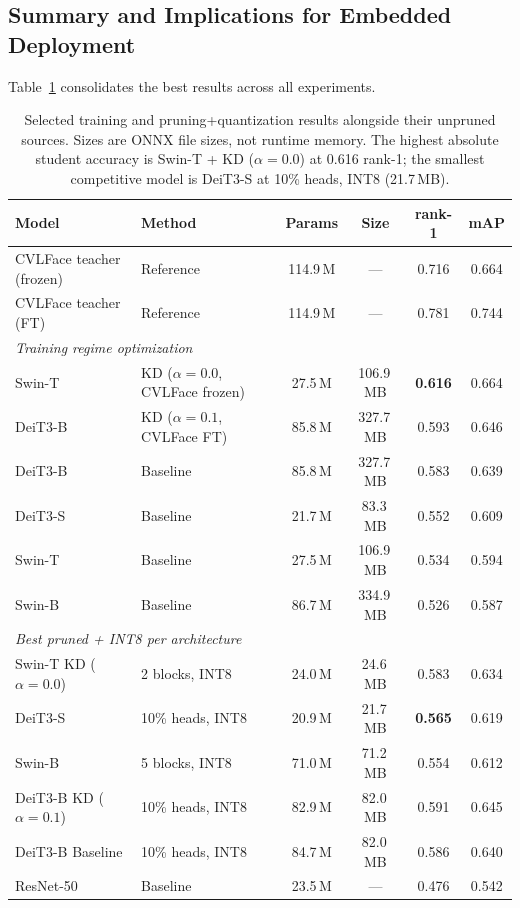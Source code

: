 \documentclass[runningheads,a4paper]{llncs}
\begin{document}
\subsection{Summary and Implications for Embedded Deployment}

Table~\ref{tab:overall-summary} consolidates the best results across all experiments.

\begin{table}[!htbp]
    \centering
    \caption{Selected training and pruning+quantization results alongside their unpruned sources. Sizes are ONNX file sizes, not runtime memory. The highest absolute student accuracy is Swin-T + KD ($\alpha{=}0.0$) at 0.616 rank-1; the smallest competitive model is DeiT3-S at 10\% heads, INT8 (21.7\,MB).}
    \label{tab:overall-summary}
    \footnotesize
    \begin{tabular*}{\linewidth}{@{\extracolsep{\fill}} l l c c c c}
        \toprule
        Model & Method & Params & Size & rank-1 & mAP \\
        \midrule
        CVLFace teacher (frozen) & Reference & 114.9\,M & --- & 0.716 & 0.664 \\
        CVLFace teacher (FT)     & Reference & 114.9\,M & --- & 0.781 & 0.744 \\
        \midrule
        \multicolumn{6}{l}{\textit{Training regime optimization}} \\
        Swin-T   & KD ($\alpha{=}0.0$, CVLFace frozen) & 27.5\,M & 106.9\,MB & \textbf{0.616} & 0.664 \\
        DeiT3-B  & KD ($\alpha{=}0.1$, CVLFace FT) & 85.8\,M & 327.7\,MB & 0.593 & 0.646 \\
        DeiT3-B  & Baseline                         & 85.8\,M & 327.7\,MB & 0.583 & 0.639 \\
        DeiT3-S  & Baseline                         & 21.7\,M & 83.3\,MB  & 0.552 & 0.609 \\
        Swin-T   & Baseline                         & 27.5\,M & 106.9\,MB & 0.534 & 0.594 \\
        Swin-B   & Baseline                         & 86.7\,M & 334.9\,MB & 0.526 & 0.587 \\
        \midrule
        \multicolumn{6}{l}{\textit{Best pruned + INT8 per architecture}} \\
        Swin-T KD ($\alpha{=}0.0$) & 2 blocks, INT8 & 24.0\,M & 24.6\,MB & 0.583 & 0.634 \\
        DeiT3-S    & 10\% heads, INT8 & 20.9\,M & 21.7\,MB & \textbf{0.565} & 0.619 \\
        Swin-B     & 5 blocks, INT8   & 71.0\,M & 71.2\,MB & 0.554 & 0.612 \\
        DeiT3-B KD ($\alpha{=}0.1$) & 10\% heads, INT8 & 82.9\,M & 82.0\,MB & 0.591 & 0.645 \\
        DeiT3-B Baseline & 10\% heads, INT8 & 84.7\,M & 82.0\,MB & 0.586 & 0.640 \\
        \midrule
        ResNet-50 & Baseline                        & 23.5\,M & --- & 0.476 & 0.542 \\
        \bottomrule
    \end{tabular*}
\end{table}
\end{document}
